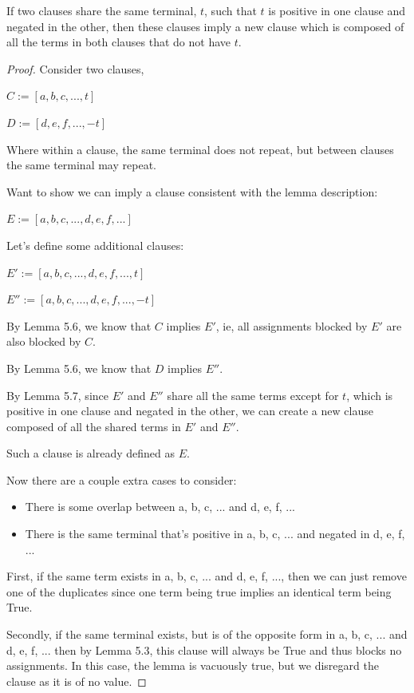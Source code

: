 \documentclass[manuscript]{acmart}
\begin{document}
    \begin{lemma}
        If two clauses share the same terminal, $t$, such that $t$ is 
        positive in one clause and negated in the other, then these clauses 
        imply a new clause which is composed of all the terms in both clauses 
        that do not have $t$.
    \end{lemma}
    \begin{proof}
        Consider two clauses, 

        $C := [a, b, c, ..., t]$
        
        $D := [d, e, f, ..., -t]$

        Where within a clause, the same terminal does not repeat, but between
        clauses the same terminal may repeat.

        Want to show we can imply a clause consistent with the lemma description:

        $E := [a, b, c, ..., d, e, f, ...]$

        Let's define some additional clauses:

        $E' := [a, b, c, ..., d, e, f, ..., t]$

        $E'' := [a, b, c, ..., d, e, f, ..., -t]$

        By Lemma 5.6, we know that $C$ implies $E'$, ie, all assignments blocked by
        $E'$ are also blocked by $C$.

        By Lemma 5.6, we know that $D$ implies $E''$.

        By Lemma 5.7, since $E'$ and $E''$ share all the same terms except 
        for $t$, which is positive in one clause and negated in the other, 
        we can create a new clause composed of all the shared terms in $E'$ 
        and $E''$.

        Such a clause is already defined as $E$.

        Now there are a couple extra cases to consider:
        
        \begin{itemize}
            \item There is some overlap between a, b, c, ... and d, e, f, ...
            \item There is the same terminal that's positive in a, b, c, ...
            and negated in d, e, f, ...
        \end{itemize}

        First, if the same term exists in a, b, c, ... and d, e, f, ..., then we
        can just remove one of the duplicates since one term being true implies an identical term being True.

        Secondly, if the same terminal exists, but is of the opposite form in a, b, c, ... and d, e, f, ...
        then by Lemma 5.3, this clause will always be True and thus blocks no assignments. In this case, 
        the lemma is vacuously true, but we disregard the clause as it is of no value.
        
    \end{proof}
\end{document}
